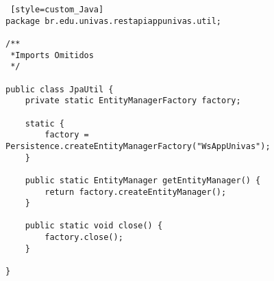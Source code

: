 
\begin{lstlisting} [style=custom_Java] 	
package br.edu.univas.restapiappunivas.util;

/**
 *Imports Omitidos
 */

public class JpaUtil {
	private static EntityManagerFactory factory;

	static {
		factory = Persistence.createEntityManagerFactory("WsAppUnivas");
	}

	public static EntityManager getEntityManager() {
		return factory.createEntityManager();
	}

	public static void close() {
		factory.close();
	}

}
	
\end{lstlisting}